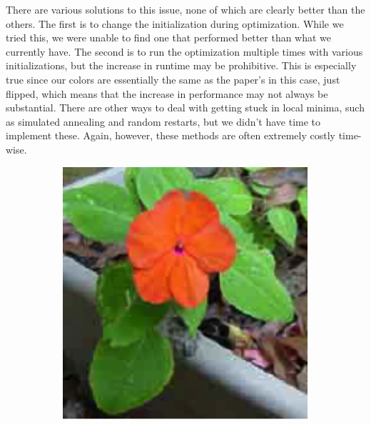 \documentclass[10pt,twocolumn,letterpaper]{article}
\begin{document}
There are various solutions to this issue, none of which are clearly better than the others. The first is to change the initialization during optimization. While we tried this, we were unable to find one that performed better than what we currently have. The second is to run the optimization multiple times with various initializations, but the increase in runtime may be prohibitive. This is especially true since our colors are essentially the same as the paper's in this case, just flipped, which means that the increase in performance may not always be substantial. There are other ways to deal with getting stuck in local minima, such as simulated annealing and random restarts, but we didn't have time to implement these. Again, however, these methods are often extremely costly time-wise. 

\begin{figure}[h]
  \centering
  \begin{subfigure}{0.23\textwidth}
    \includegraphics[width=\textwidth]{flower1.png}
    \caption{}
  \end{subfigure}
  \begin{subfigure}{0.23\textwidth}

\end{subfigure}
\end{figure}
\end{document}
